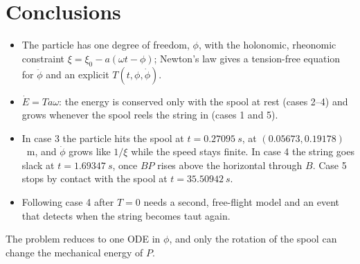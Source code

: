 \documentclass[11pt,a4paper]{article}
\numberwithin{equation}{section}
\begin{document}
\section{Conclusions}

\begin{itemize}[leftmargin=1.5em, itemsep=0.3em]
  \item The particle has one degree of freedom, $\phi$, with the holonomic, rheonomic constraint $\xi=\xi_0-a(\omega t-\phi)$; Newton's law gives a tension-free equation for $\ddot\phi$ and an explicit $T(t,\phi,\dot\phi)$.
  \item $\dot E=Ta\omega$: the energy is conserved only with the spool at rest (cases 2--4) and grows whenever the spool reels the string in (cases 1 and 5).
  \item In case 3 the particle hits the spool at $t=\SI{0.27095}{s}$, at $(\num{0.05673},\num{0.19178})$~\si{m}, and $\dot\phi$ grows like $1/\xi$ while the speed stays finite. In case 4 the string goes slack at $t=\SI{1.69347}{s}$, once $BP$ rises above the horizontal through $B$. Case 5 stops by contact with the spool at $t=\SI{35.50942}{s}$.
  \item Following case 4 after $T=0$ needs a second, free-flight model and an event that detects when the string becomes taut again.
\end{itemize}
The problem reduces to one ODE in $\phi$, and only the rotation of the spool can change the mechanical energy of $P$.

{}
{\footnotesize

}
\end{document}
